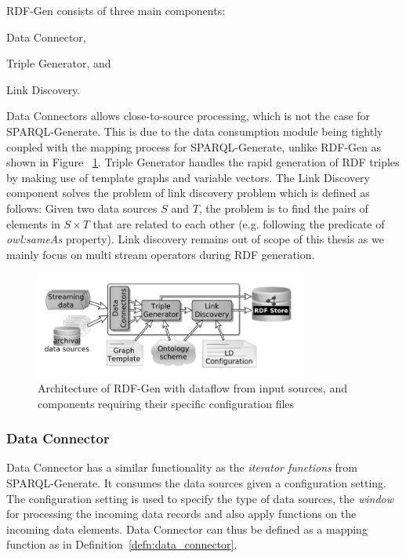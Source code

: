 RDF-Gen consists of three main components: 
\begin{enumerate*}[label=(\alph*)]
  \item Data Connector,
  \item Triple Generator, and
  \item Link Discovery.
\end{enumerate*}

Data Connectors allows close-to-source processing, 
which is not the case for SPARQL-Generate. This is due to the data consumption 
module being tightly coupled with the mapping process for SPARQL-Generate, unlike 
RDF-Gen as shown in Figure ~\ref{fig:rdf-gen-arch}. 
Triple Generator handles the rapid generation of RDF triples by making use of 
template graphs and variable vectors. The Link Discovery component solves the 
problem of link discovery problem which is defined as follows:
Given two data sources $S$ and $T$, the problem is to find the pairs of elements in 
$S \times T$ that are related to each other (e.g. following the predicate of 
\emph{owl:sameAs} property). 
Link discovery remains out of scope of this thesis as we mainly focus on 
multi stream operators during RDF generation.

\begin{figure}[!htbp]
  \centering
  \includegraphics[width=0.8\textwidth]{fig/rdf-gen-arch.png}
  \caption{Architecture of RDF-Gen with dataflow from input sources, and 
  components requiring their specific configuration files~\cite{rdf_gen}}
  \label{fig:rdf-gen-arch}
\end{figure}

\subsubsection{Data Connector}
Data Connector has a similar functionality as the \emph{iterator functions} from SPARQL-Generate.
It consumes the data sources given a configuration setting. The configuration setting is used to specify 
the type of data sources, the \emph{window} for processing the incoming data records and 
also apply functions on the incoming data elements. Data Connector can thus be defined as a 
mapping function as in Definition~\ref{defn:data_connector}. 


